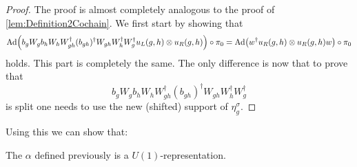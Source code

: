 \documentclass[12pt,a4paper,twoside]{article}
\numberwithin{equation}{section}
\begin{document}
\begin{proof}
The proof is almost completely analogous to the proof of \ref{lem:Definition2Cochain}. We first start by showing that
\begin{equation}
\Ad{b_g W_g b_h W_h W_{gh}^\dagger (b_{gh})^\dagger W_{gh}W_h^\dagger W_g^\dagger u_L(g,h)\otimes u_R(g,h)}\circ\pi_0=\Ad{w^\dagger u_R(g,h)\otimes u_R(g,h) w}\circ\pi_0
\end{equation}
holds. This part is completely the same. The only difference is now that to prove that
\begin{equation}
b_g W_g b_h W_h W_{gh}^\dagger (b_{gh})^\dagger W_{gh}W_h^\dagger W_g^\dagger
\end{equation}
 is split one needs to use the new (shifted) support of $\eta_g^\sigma$.
\end{proof}
Using this we can show that:
\begin{lemma}
	The $\alpha$ defined previously is a $U(1)$-representation.
\end{lemma}
\end{document}
